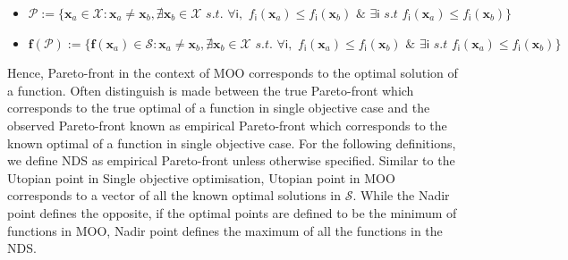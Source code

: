 \begin{itemize}
\item  ${\mathscr{P}}:=\{\bm x_a \in \mathcal{X} : \bm x_a \neq \bm x_b, \nexists  \bm x_b \in \mathcal{X} \,\, s.t. \,\, \forall \mathsf{i}, \,\, f_{\mathsf{i}}(\bm x_a) \leq f_{\mathsf{i}}(\bm x_b)\,\, \& \,\, \exists \mathsf{i} \,\, s.t \,\, f_{\mathsf{i}}(\bm x_a) \leq f_{\mathsf{i}}(\bm x_b) \}$
\item  $\bm{f} ({\mathscr{P}}):=\{\bm f(\bm x_a) \in \mathcal{S} : \bm x_a \neq \bm x_b, \nexists  \bm x_b \in \mathcal{X} \,\, s.t. \,\, \forall \mathsf{i}, \,\, f_{\mathsf{i}}(\bm x_a) \leq f_{\mathsf{i}}(\bm x_b)\,\, \& \,\, \exists \mathsf{i} \,\, s.t \,\, f_{\mathsf{i}}(\bm x_a) \leq f_{\mathsf{i}}(\bm x_b) \}$

\end{itemize}

Hence, Pareto-front in the context of MOO corresponds to the optimal solution of a function. Often distinguish is made between the true Pareto-front which corresponds to the true optimal of a function in single objective case and the observed Pareto-front known as empirical Pareto-front which corresponds to the known optimal of a function in single objective case. For the following definitions, we define NDS as empirical Pareto-front unless otherwise specified. Similar to the Utopian point in Single objective optimisation, Utopian point in MOO corresponds to a vector of all the known optimal solutions in $\mathcal{S}$. While the Nadir point defines the opposite, if the optimal points are defined to be the minimum of functions in MOO, Nadir point defines the maximum of all the functions in the NDS.\\

